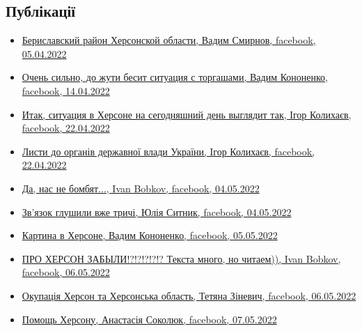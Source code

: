  
 
 
 
 
\subsection{Публікації}

\begin{itemize} %

\item \hyperlink{05_04_2022.fb.smirnov_vadim.odessa.rieltor.1.berislav_rajon}{%
Бериславский район Херсонской области, Вадим Смирнов, facebook, 05.04.2022%
}

\item \hyperlink{14_04_2022.fb.kononenko_vadim.herson.1.torgashi}{%
Очень сильно, до жути бесит ситуация с торгашами, Вадим Кононенко, facebook, 14.04.2022%
}

\item \hyperlink{22_04_2022.fb.kolyhaev_igor.herson.mer.1.herson}{%
Итак, ситуация в Херсоне на сегодняшний день выглядит так, Ігор Колихаєв, facebook, 22.04.2022%
}

\item \hyperlink{26_04_2022.fb.kolyhaev_igor.herson.mer.1.lysty}{%
Листи до органів державної влади України, Ігор Колихаєв, facebook, 22.04.2022%
}

\item \hyperlink{04_05_2022.fb.bobkov_ivan.1.nas_ne_bombjat}{%
Да, нас не бомбят..., Ivan Bobkov, facebook, 04.05.2022%
}

\item \hyperlink{04_05_2022.fb.sytnik_julia.herson.1.zvjazok_glyshili_trychi}{%
Зв'язок глушили вже тричі, Юлія Ситник, facebook, 04.05.2022%
}

\item \hyperlink{05_05_2022.fb.kononenko_vadim.herson.1.kartina_v_hersone}{%
Картина в Херсоне, Вадим Кононенко, facebook, 05.05.2022%
}

\item \hyperlink{06_05_2022.fb.bobkov_ivan.1.pro_herson_zabyli}{%
ПРО ХЕРСОН ЗАБЫЛИ!?!?!?!?!?  Текста много, но читаем)), Ivan Bobkov, facebook, 06.05.2022%
}

\item \hyperlink{06_05_2022.fb.zinevich_tetjana.herson.1.okupacia}{%
Окупація Херсон та Херсонська область, Тетяна Зіневич, facebook, 06.05.2022%
}

\item \hyperlink{07_05_2022.fb.sokoljuk_anastasia.1.pomosch_hersonu}{%
Помощь Херсону, Анастасія Соколюк, facebook, 07.05.2022%
}

\end{itemize} %
